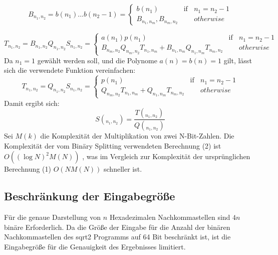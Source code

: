 \documentclass[course=erap]{aspdoc}
\begin{document}
	\begin{equation*}
		B_{n_1,n_2} = b(n_1) ... b(n_2 - 1) =  \left\{ \begin{array}{rcl}		
			b(n_1)  & \mbox{if} & n_1 = n_2 - 1  \\
			B_{n_1,n_m},B_{n_m,n_2}  & \mbox{ } &  otherwise
		\end{array}\right.
	\end{equation*}	
	
	\begin{equation*}
		T_{n_1,n_2} = B_{n_1,n_2}Q_{n_1,n_2}S_{n_1,n_2} =  \left\{ \begin{array}{rcl}		
			a(n_1)p(n_1) & \mbox{if} & n_1 = n_2 - 1  \\
			B_{n_m,n_2}Q_{n_m,n_2}T_{n_1,n_m} + B_{n_1,n_m}Q_{n_1,n_m}T_{n_m,n_2}
			& \mbox{ } &  otherwise
		\end{array}\right.
	\end{equation*}
	Da $n_1 = 1$ gewählt werden soll, und die Polynome $a(n) = b(n) = 1$ gilt, lässt sich die 
	verwendete Funktion vereinfachen:
	\begin{equation*}
		T_{n_1,n_2} =Q_{n_1,n_2}S_{n_1,n_2} =  \left\{ \begin{array}{rcl}		
			p(n_1) & \mbox{if} & n_1 = n_2 - 1  \\
			Q_{n_m,n_2}T_{n_1,n_m} + Q_{n_1,n_m}T_{n_m,n_2}
			& \mbox{ } &  otherwise
		\end{array}\right.
	\end{equation*}
	Damit ergibt sich:
	\begin{equation}
		S(_{n_1,n_2}) = \frac{T(_{n_1,n_2}) }{Q(_{n_1,n_2}) }
	\end{equation}
	Sei $M(k)$ die Komplexität der Multiplikation von zwei N-Bit-Zahlen. 
	Die Komplexität der vom Binäry Splitting verwendeten Berechnung (2) ist 
	$O((\log N)^2 M(N))$ \cite{haible1998fast}, was im Vergleich zur Komplexität der ursprünglichen 
	Berechnung (1) $O(NM(N))$ \cite{borwein1987pi} schneller ist.
	
	\subsection{Beschränkung der Eingabegröße}
	Für die genaue Darstellung von $n$ Hexadezimalen Nachkommastellen sind $4n$ binäre Erforderlich. Da die Größe der Eingabe für die Anzahl der binären Nachkommastellen des sqrt2 Programms auf 64 Bit beschränkt ist, ist die Eingabegröße für die Genauigkeit des Ergebnisses limitiert.
	
\end{document}
